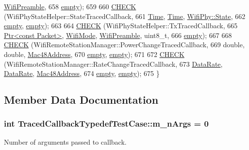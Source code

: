\begin{DoxyCode}
      \hyperlink{group__wifi_ga5e94a56cb338a14ffbbb19c6a41251eb}{WifiPreamble},
658          \hyperlink{classns3_1_1empty}{empty});
659 
660   \hyperlink{traced-callback-typedef-test-suite_8cc_aa79806eee113005f96d9d3cb1480ce98}{CHECK} (WifiPhyStateHelper::StateTracedCallback,
661          \hyperlink{classns3_1_1Time}{Time}, \hyperlink{classns3_1_1Time}{Time}, \hyperlink{classns3_1_1WifiPhy_af97408fa76f99797497b492758467143}{WifiPhy::State},
662          \hyperlink{classns3_1_1empty}{empty}, \hyperlink{classns3_1_1empty}{empty});
663 
664   \hyperlink{traced-callback-typedef-test-suite_8cc_aa79806eee113005f96d9d3cb1480ce98}{CHECK} (WifiPhyStateHelper::TxTracedCallback,
665          \hyperlink{classns3_1_1Ptr}{Ptr<const Packet>}, \hyperlink{classns3_1_1WifiMode}{WifiMode}, \hyperlink{group__wifi_ga5e94a56cb338a14ffbbb19c6a41251eb}{WifiPreamble}, uint8\_t,
666          \hyperlink{classns3_1_1empty}{empty});
667 
668   \hyperlink{traced-callback-typedef-test-suite_8cc_aa79806eee113005f96d9d3cb1480ce98}{CHECK} (WifiRemoteStationManager::PowerChangeTracedCallback,
669          \textcolor{keywordtype}{double}, \textcolor{keywordtype}{double}, \hyperlink{classns3_1_1Mac48Address}{Mac48Address},
670          \hyperlink{classns3_1_1empty}{empty}, \hyperlink{classns3_1_1empty}{empty});
671 
672   \hyperlink{traced-callback-typedef-test-suite_8cc_aa79806eee113005f96d9d3cb1480ce98}{CHECK} (WifiRemoteStationManager::RateChangeTracedCallback,
673          \hyperlink{classns3_1_1DataRate}{DataRate}, \hyperlink{classns3_1_1DataRate}{DataRate}, \hyperlink{classns3_1_1Mac48Address}{Mac48Address},
674          \hyperlink{classns3_1_1empty}{empty}, \hyperlink{classns3_1_1empty}{empty});
675 \}
\end{DoxyCode}


\subsection{Member Data Documentation}
\subsubsection[{\texorpdfstring{m\+\_\+n\+Args}{m_nArgs}}]{\setlength{\rightskip}{0pt plus 5cm}int Traced\+Callback\+Typedef\+Test\+Case\+::m\+\_\+n\+Args = 0\hspace{0.3cm}{\ttfamily [static]}}\hypertarget{classTracedCallbackTypedefTestCase_acbfc57f4409ca3185b6048cefe389192}{}\label{classTracedCallbackTypedefTestCase_acbfc57f4409ca3185b6048cefe389192}
Number of arguments passed to callback.

